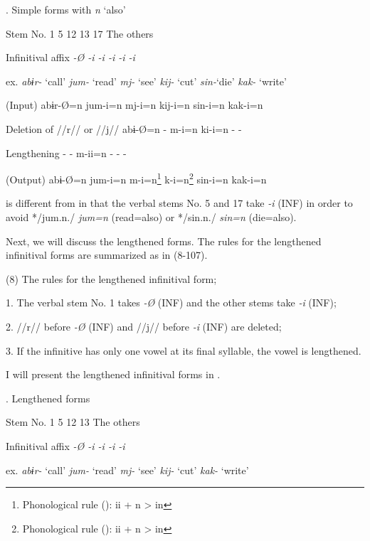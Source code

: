 \begin{styleBeschriftung}
\textmd{}\textmd{. Simple forms with} \textmd{\textit{n} }\textmd{‘also’}
\end{styleBeschriftung}

Stem No.  1  5  12  13  17  The others

Infinitival affix  \textit{{}-Ø  {}-i  {}-i  {}-i  {}-i  {}-i}

ex.  \textit{abɨr-} ‘call’  \textit{jum-} ‘read’  \textit{mj-} ‘see’  \textit{kij-} ‘cut’  \textit{sin-}‘die’  \textit{kak-} ‘write’

(Input)  abɨr-Ø=n  jum-i=n  mj-i=n  kij-i=n  sin-i=n  kak-i=n

Deletion of //r// or //j//  abɨ-Ø=n  {}-  m-i=n  ki-i=n  {}-  {}-

Lengthening  {}-  {}-  m-ii=n  {}-  {}-  {}-

(Output)  abɨ-Ø=n  jum-i=n  m-i=n\footnote{Phonological rule (): ii + n > in}  k-i=n\footnote{Phonological rule (): ii + n > in}  sin-i=n  kak-i=n

 is different from  in that the verbal stems No. 5 and 17 take \textit{{}-i} (INF) in order to avoid */jum.n./ \textit{jum=n} (read=also) or */sin.n./ \textit{sin=n} (die=also).

  Next, we will discuss the lengthened forms. The rules for the lengthened infinitival forms are summarized as in (8-107).

(8)  The rules for the lengthened infinitival form;

  1.  The verbal stem No. 1 takes \textit{{}-Ø} (INF) and the other stems take \textit{{}-i} (INF);

  2.  //r// before \textit{{}-Ø} (INF) and //j// before \textit{{}-i} (INF) are deleted;

  3.  If the infinitive has only one vowel at its final syllable, the vowel is lengthened.

I will present the lengthened infinitival forms in .

\begin{styleBeschriftung}
\textmd{}\textmd{. Lengthened forms}
\end{styleBeschriftung}

Stem No.  1  5  12  13  The others

Infinitival affix  \textit{{}-Ø  {}-i  {}-i  {}-i  {}-i}

ex.  \textit{abɨr-} ‘call’  \textit{jum-} ‘read’  \textit{mj-} ‘see’  \textit{kij-} ‘cut’  \textit{kak-} ‘write’

